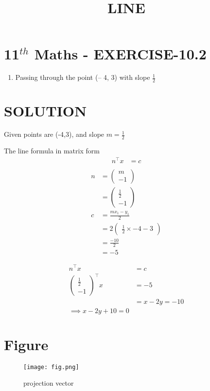 \documentclass[12pt]{article}
\newcommand{\myvec}[1]{\ensuremath{\begin{pmatrix}#1\end{pmatrix}}}
\begin{document}
\begin{center}
\title{\textbf{LINE}}
\date{\vspace{-5ex}} %
\maketitle
\end{center}

\section{11$^{th}$ Maths - EXERCISE-10.2}
\begin{enumerate}
\item Passing through the point (– 4, 3) with slope $\frac{1}{2}$
\end{enumerate}
\section{SOLUTION}
Given points are (-4,3), and slope $m=\frac{1}{2}$

The line formula in matrix form
\begin{align}
n^\top x&=c\\
\end{align}
\begin{align}
n&=\myvec{m\\-1}\\
&=\myvec{\frac{1}{2}\\-1}\\
c&=\frac{mx_1-y_1}{2}\\
&=2 \myvec{\frac{1}{2}\times-4-3}\\
&=\frac{-10}{2}\\
&=-5
\end{align}

\begin{align}
n^\top x&=c\\
\myvec{\frac{1}{2}\\-1}^\top x&=-5\\
&=x-2y=-10\\
\implies x-2y+10=0
\end{align} 
\section{Figure}
\begin{figure}[h]
\texttt{[image: fig.png]}
\caption{projection vector}
		\label{fig:Figure}
\end{figure}
\end{document}
